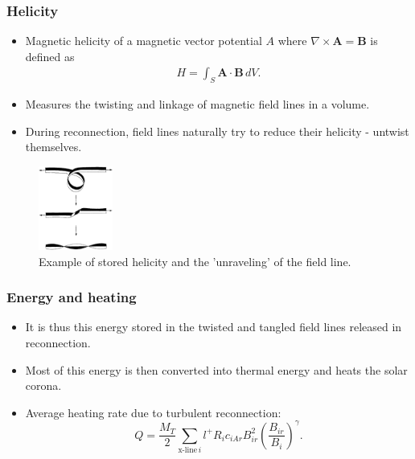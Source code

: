 \documentclass{beamer}
\begin{document}
\begin{frame}
    \frametitle{Helicity}
    \small
    \begin{itemize}
        \item Magnetic helicity of a magnetic vector potential $A$ where $\nabla\times\mathbf{A}=\mathbf{B}$ is defined as 
        \begin{align*}
            H = \int_S \mathbf{A}\cdot\mathbf{B}\, dV.
        \end{align*}
        \item Measures the twisting and linkage of magnetic field lines in a volume.
        \item During reconnection, field lines naturally try to reduce their helicity - untwist themselves.
    \end{itemize}
    \begin{figure}
        \centering
        \includegraphics[height=2.75cm]{images/helicity.jpeg}
        \caption{Example of stored helicity and the 'unraveling' of the field line.}
        \label{fig:helicity}
    \end{figure}
\end{frame}
\begin{frame}
    \frametitle{Energy and heating}
    \small
    \begin{itemize}
        \item It is thus this energy stored in the twisted and tangled field lines released in reconnection.
        \item Most of this energy is then converted into thermal energy and heats the solar corona.
        \item Average heating rate due to turbulent reconnection:
        $$Q=\frac{M_T}{2}\sum_{\text{x-line}\,i} l^{+} R_i c_{iAr}B_{ir}^2(\frac{B_{ir}}{B_i})^\gamma.$$ %
    \end{itemize}
\end{frame}


\end{document}
